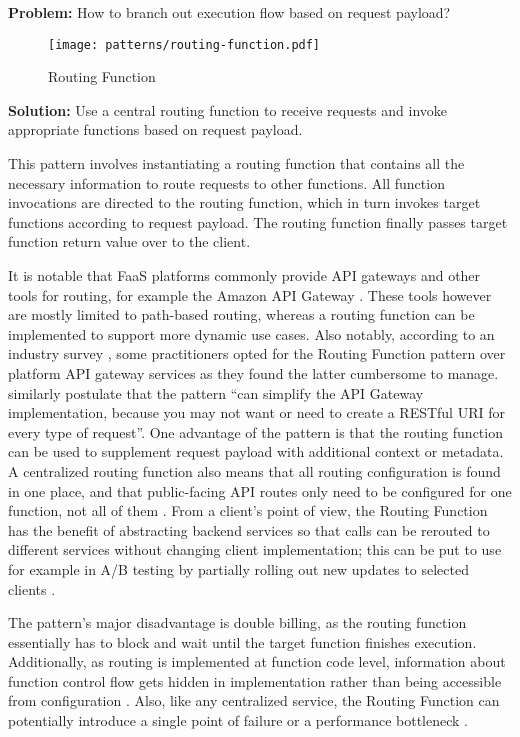 \textbf{Problem:} How to branch out execution flow based on request payload?

\begin{figure}[h]
  \centering
  \texttt{[image: patterns/routing-function.pdf]}
  \caption{Routing Function}
  \label{fig:patternRoutingFunction}
\end{figure}

\textbf{Solution:} Use a central routing function to receive requests and invoke appropriate functions based on request payload.

This pattern involves instantiating a routing function that contains all the necessary information to route requests to other functions. All function invocations are directed to the routing function, which in turn invokes target functions according to request payload. The routing function finally passes target function return value over to the client.

It is notable that FaaS platforms commonly provide API gateways and other tools for routing, for example the Amazon API Gateway \parencite{awslambda0218}. These tools however are mostly limited to path-based routing, whereas a routing function can be implemented to support more dynamic use cases. Also notably, according to an industry survey \parencite{leitner18industrialpractice}, some practitioners opted for the Routing Function pattern over platform API gateway services as they found the latter cumbersome to manage. \textcite{sbarski2017serverless} similarly postulate that the pattern ``can simplify the API Gateway implementation, because you may not want or need to create a RESTful URI for every type of request''. One advantage of the pattern is that the routing function can be used to supplement request payload with additional context or metadata. A centralized routing function also means that all routing configuration is found in one place, and that public-facing API routes only need to be configured for one function, not all of them \parencite{leitner18industrialpractice}. From a client's point of view, the Routing Function has the benefit of abstracting backend services so that calls can be rerouted to different services without changing client implementation; this can be put to use for example in A/B testing by partially rolling out new updates to selected clients \parencite{microsoft18cloudPatterns}.

The pattern's major disadvantage is double billing, as the routing function essentially has to block and wait until the target function finishes execution. Additionally, as routing is implemented at function code level, information about function control flow gets hidden in implementation rather than being accessible from configuration \parencite{leitner18industrialpractice}. Also, like any centralized service, the Routing Function can potentially introduce a single point of failure or a performance bottleneck \parencite{microsoft18cloudPatterns}.

